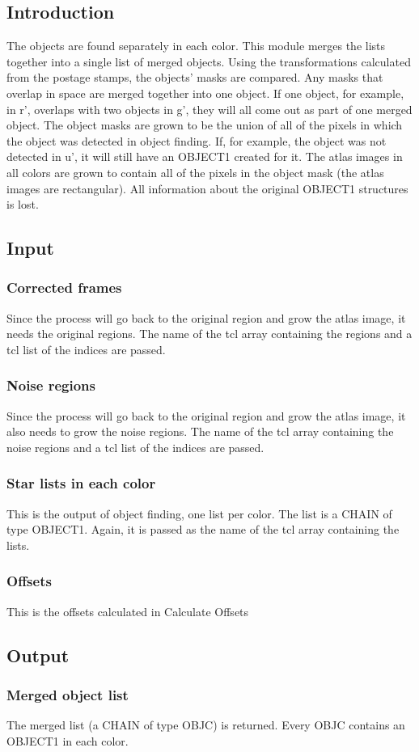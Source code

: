 \subsection{Introduction}

The objects are found separately in each color.  This module merges the
lists together into a single list of merged objects.  Using the transformations
calculated from the postage stamps, the objects' masks are compared.
Any masks that overlap in space are merged together into one object.  If
one object, for example, in r', overlaps with two objects in g', they will
all come out as part of one merged object.  The object masks are grown to
be the union of all of the pixels in which the object was detected in
object finding.  If, for example, the object was not detected in u', it
will still have an OBJECT1 created for it.  The atlas images in all colors
are grown to contain all of the pixels in the object mask (the atlas images
are rectangular).  All information about the original OBJECT1 structures
is lost.

\subsection{Input}

\subsubsection{Corrected frames}

Since the process will go back to the original region and grow the atlas
image, it needs the original regions.  The name of the tcl array containing
the regions and a tcl list of the indices are passed.

\subsubsection{Noise regions}

Since the process will go back to the original region and grow the atlas
image, it also needs to grow the noise regions.  The name of the tcl array 
containing the noise regions and a tcl list of the indices are passed.

\subsubsection{Star lists in each color}

This is the output of object finding, one list per color.  The list is
a CHAIN of type OBJECT1.  Again, it is
passed as the name of the tcl array containing the lists.

\subsubsection{Offsets}

This is the offsets calculated in Calculate Offsets

\subsection{Output}

\subsubsection{Merged object list}

The merged list (a CHAIN of type OBJC) is returned.  Every OBJC contains
an OBJECT1 in each color.
